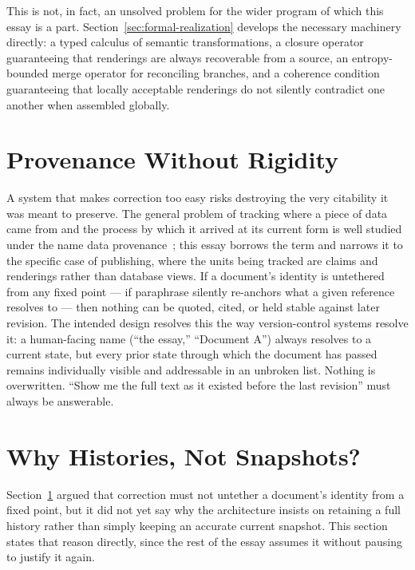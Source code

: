 \documentclass[11pt]{article}
\theoremstyle{definition}
\begin{document}
This is not, in fact, an unsolved problem for the wider program of which this essay is a part. Section~\ref{sec:formal-realization} develops the necessary machinery directly: a typed calculus of semantic transformations, a closure operator guaranteeing that renderings are always recoverable from a source, an entropy-bounded merge operator for reconciling branches, and a coherence condition guaranteeing that locally acceptable renderings do not silently contradict one another when assembled globally.

\section{Provenance Without Rigidity}
\label{sec:provenance-rigidity}

A system that makes correction too easy risks destroying the very citability it was meant to preserve. The general problem of tracking where a piece of data came from and the process by which it arrived at its current form is well studied under the name data provenance~\cite{buneman2001}; this essay borrows the term and narrows it to the specific case of publishing, where the units being tracked are claims and renderings rather than database views. If a document's identity is untethered from any fixed point --- if paraphrase silently re-anchors what a given reference resolves to --- then nothing can be quoted, cited, or held stable against later revision. The intended design resolves this the way version-control systems resolve it: a human-facing name (``the essay,'' ``Document A'') always resolves to a current state, but every prior state through which the document has passed remains individually visible and addressable in an unbroken list. Nothing is overwritten. ``Show me the full text as it existed before the last revision'' must always be answerable.

\section{Why Histories, Not Snapshots?}
\label{sec:histories-not-snapshots}

Section~\ref{sec:provenance-rigidity} argued that correction must not untether a document's identity from a fixed point, but it did not yet say why the architecture insists on retaining a full history rather than simply keeping an accurate current snapshot. This section states that reason directly, since the rest of the essay assumes it without pausing to justify it again.
\end{document}
